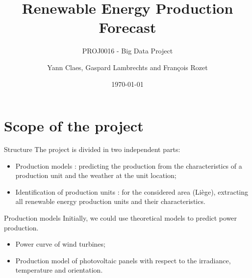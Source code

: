 \documentclass[12pt]{beamer}
\title{Renewable Energy Production Forecast}
\subtitle{PROJ0016 - Big Data Project}
\author{Yann Claes, Gaspard Lambrechts and François Rozet}
\institute{University of Liège}
\date{\today}
\begin{document}
\maketitle

\section{Scope of the project}

\begin{frame}{Structure}
    The project is divided in two independent parts:
    \begin{itemize}
        \item \alert{Production models} : predicting the production from the characteristics of a production unit and the weather at the unit location;
        \item \alert{Identification of production units} : for the considered area (Liège), extracting all renewable energy production units and their characteristics.
    \end{itemize}
\end{frame}

\begin{frame}{Production models}
    \alert{Initially}, we could use theoretical models to predict power production.
    \begin{itemize}
        \item<1-> Power curve of wind turbines;
        \item<2-> Production model of photovoltaic panels with respect to the irradiance, temperature and orientation.
    \end{itemize}
\end{frame}
\end{document}

